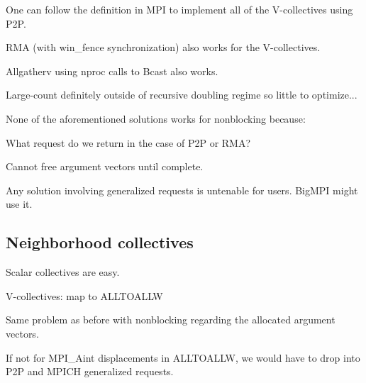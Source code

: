 
One can follow the definition in MPI to implement all of the V-collectives using P2P.

RMA (with win\_fence synchronization) also works for the V-collectives.

Allgatherv using nproc calls to Bcast also works.

Large-count definitely outside of recursive doubling regime so little to optimize...


None of the aforementioned solutions works for nonblocking because:

What request do we return in the case of P2P or RMA?

Cannot free argument vectors until complete.

Any solution involving generalized requests is untenable for users.  BigMPI might use it.

\subsection{Neighborhood collectives}

Scalar collectives are easy.

V-collectives: map to ALLTOALLW

Same problem as before with nonblocking regarding the allocated argument vectors.

If not for MPI\_Aint displacements in ALLTOALLW, we would have to drop into P2P and MPICH generalized requests.
